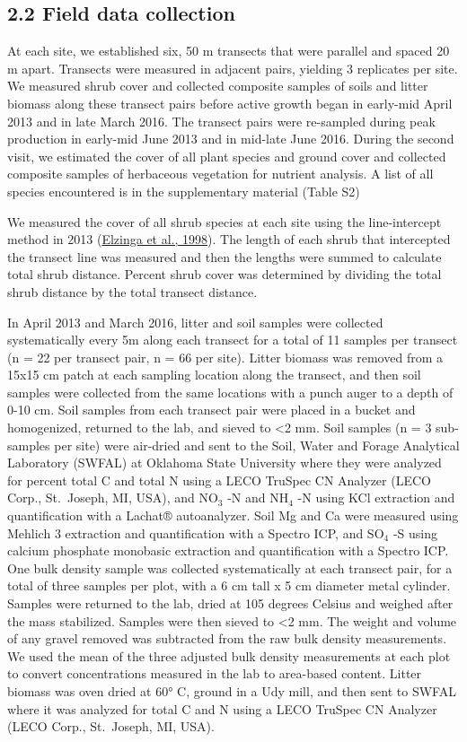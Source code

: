 \documentclass[
  11pt,
  a4paper,
]{article}
\begin{document}
\hypertarget{field-data-collection}{%
\subsection{2.2 Field data collection}\label{field-data-collection}}

At each site, we established six, 50 m transects that were parallel and spaced 20 m apart. Transects were measured in adjacent pairs, yielding 3 replicates per site. We measured shrub cover and collected composite samples of soils and litter biomass along these transect pairs before active growth began in early-mid April 2013 and in late March 2016. The transect pairs were re-sampled during peak production in early-mid June 2013 and in mid-late June 2016. During the second visit, we estimated the cover of all plant species and ground cover and collected composite samples of herbaceous vegetation for nutrient analysis. A list of all species encountered is in the supplementary material (Table S2)

We measured the cover of all shrub species at each site using the line-intercept method in 2013 (\protect\hyperlink{ref-Elzinga1998}{Elzinga et al., 1998}). The length of each shrub that intercepted the transect line was measured and then the lengths were summed to calculate total shrub distance. Percent shrub cover was determined by dividing the total shrub distance by the total transect distance.

In April 2013 and March 2016, litter and soil samples were collected systematically every 5m along each transect for a total of 11 samples per transect (n = 22 per transect pair, n = 66 per site). Litter biomass was removed from a 15x15 cm patch at each sampling location along the transect, and then soil samples were collected from the same locations with a punch auger to a depth of 0-10 cm. Soil samples from each transect pair were placed in a bucket and homogenized, returned to the lab, and sieved to \textless2 mm. Soil samples (n = 3 sub-samples per site) were air-dried and sent to the Soil, Water and Forage Analytical Laboratory (SWFAL) at Oklahoma State University where they were analyzed for percent total C and total N using a LECO TruSpec CN Analyzer (LECO Corp., St.~Joseph, MI, USA), and NO\(_3\) -N and NH\(_4\) -N using KCl extraction and quantification with a Lachat® autoanalyzer. Soil Mg and Ca were measured using Mehlich 3 extraction and quantification with a Spectro ICP, and SO\(_4\) -S using calcium phosphate monobasic extraction and quantification with a Spectro ICP. One bulk density sample was collected systematically at each transect pair, for a total of three samples per plot, with a 6 cm tall x 5 cm diameter metal cylinder. Samples were returned to the lab, dried at 105 degrees Celsius and weighed after the mass stabilized. Samples were then sieved to \textless2 mm. The weight and volume of any gravel removed was subtracted from the raw bulk density measurements. We used the mean of the three adjusted bulk density measurements at each plot to convert concentrations measured in the lab to area-based content. Litter biomass was oven dried at 60° C, ground in a Udy mill, and then sent to SWFAL where it was analyzed for total C and N using a LECO TruSpec CN Analyzer (LECO Corp., St.~Joseph, MI, USA).
\end{document}
